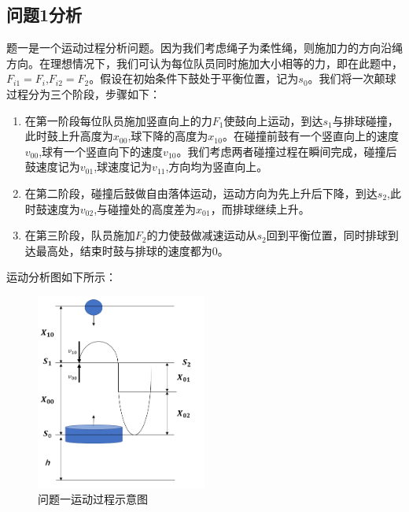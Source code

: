 \documentclass{cumcm}
\begin{document}
\subsection{问题1分析}
题一是一个运动过程分析问题。因为我们考虑绳子为柔性绳，则施加力的方向沿绳方向。在理想情况下，我们可认为每位队员同时施加大小相等的力，即在此题中，$F_{i1}=F_i$,$F_{i2}=F_2$。假设在初始条件下鼓处于平衡位置，记为$s_0$。我们将一次颠球过程分为三个阶段，步骤如下：
\begin{enumerate}
\item 在第一阶段每位队员施加竖直向上的力$F_1$使鼓向上运动，到达$s_1$与排球碰撞，此时鼓上升高度为$x_{00}$,球下降的高度为$x_{10}$。在碰撞前鼓有一个竖直向上的速度$v_{00}$,球有一个竖直向下的速度$v_{10}$。我们考虑两者碰撞过程在瞬间完成，碰撞后鼓速度记为$v_{01}$,球速度记为$v_{11}$,方向均为竖直向上。
\item 在第二阶段，碰撞后鼓做自由落体运动，运动方向为先上升后下降，到达$s_2$,此时鼓速度为$v_{02}$,与碰撞处的高度差为$x_{01}$，而排球继续上升。
\item 在第三阶段，队员施加$F_2$的力使鼓做减速运动从$s_2$回到平衡位置，同时排球到达最高处，结束时鼓与排球的速度都为$0$。
\end{enumerate}
运动分析图如下所示：
\begin{figure}[H]
\centering
\includegraphics[width=0.5\textwidth]{img/question1.png}
\caption{问题一运动过程示意图}\label{fig-buoy}
\end{figure}
\end{document}
